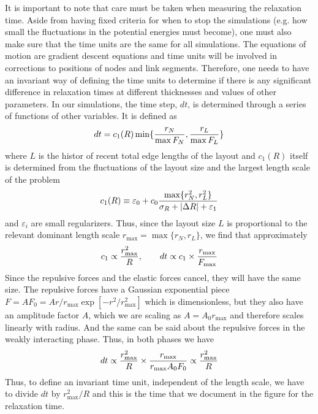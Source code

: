 \documentclass[nofootinbib,preprint,floatfix,titlepage,superscriptaddress]{revtex4} %
\begin{document}
It is important to note that care must be taken when measuring the relaxation time. 
Aside from having fixed criteria for when to stop the simulations (e.g. how small the fluctuations in the potential energies must become), one must also make sure that the time units are the same for all simulations. 
The equations of motion are gradient descent equations and time units will be involved in corrections to positions of nodes and link segments. 
Therefore, one needs to have an invariant way of defining the time units to determine if there is any significant difference in relaxation times at different thicknesses and values of other parameters. 
In our simulations, the time step, $dt$, is determined through a series of functions of other variables. 
It is defined as 
$$dt = c_1( R) \min\{{r_N\over \max{F_N}},{r_L\over \max{F_L}}\} $$
where $L$ is the histor of recent total edge lengths of the layout and  $c_1(R)$ itself is determined from the fluctuations of the layout size and the largest length scale of the problem
$$ c_1(R) \equiv \varepsilon_0 + c_0 {\max\{r_N^2, r_L^2\}\over \sigma_R + |\Delta R|+\varepsilon_1}$$
and $\varepsilon_i$ are small regularizers. 
Thus, since the layout size $L$ is proportional to the relevant dominant length scale $r_{\max} = \max{\{r_N, r_L\}} $, we find that approximately
\[ c_1 \propto {r_{\max}^2\over R}, \qquad dt \propto c_1 \times {r_{\max} \over F_{\max}} \]
Since the repulsive forces and the elastic forces cancel, they will have the same size. The repulsive forces have a Gaussian exponential piece $ F = A F_0 = A r/r_{\max} \exp[-r^2/r^2_{\max}] $ which is dimensionless, but they also have an amplitude factor $A$, which we are scaling as $A = A_0 r_{\max}$ and therefore scales linearly with radius. And the same can be said about the repulsive forces in the weakly interacting phase. 
Thus, in both phases we have
$$ dt \propto {r_{\max}^2\over R} \times {r_{\max} \over r_{\max} A_0 F_0 } \propto {r_{\max}^2\over R} $$
Thus, to define an invariant time unit, independent of the length scale, we have to divide $dt$ by $r_{\max}^2/ R$ and this is the time that we document in the figure for the relaxation time. 
\end{document}
